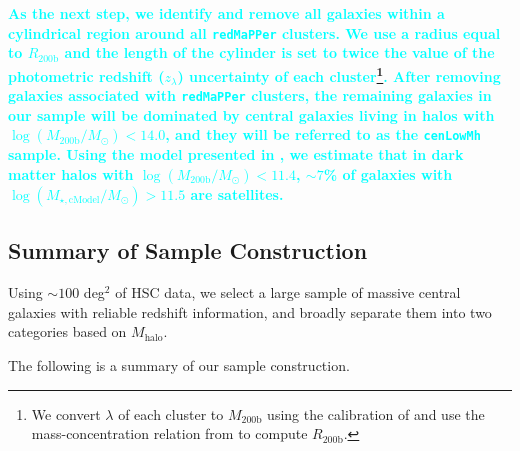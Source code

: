 \documentclass[a4paper,fleqn,usenatbib]{mnras}
\def\redm{\texttt{redMaPPer}}
\def\nbcg{\texttt{cenLowMh}}
\def\logmh{{$\log (M_{\mathrm{200b}}/M_{\odot})$}}
\def\logmcmodel{{$\log (M_{\star,\mathrm{cModel}}/M_{\odot})$}}
\newcommand{\song}[1]{\textcolor{cyan}{\textbf{#1}}}
\begin{document}
    \song{
    As the next step, we identify and remove all galaxies within a cylindrical 
    region around all \redm{} clusters. 
    We use a radius equal to $R_{\mathrm{200b}}$ and the length of the cylinder is 
    set to twice the value of the photometric redshift ($z_{\lambda}$) uncertainty 
    of each cluster\footnote{We convert $\lambda$ of each cluster to 
    $M_{\mathrm{200b}}$ using the calibration of \citet{Simet2016} and use the 
    mass-concentration relation from \citet{Diemer2015} to compute 
    $R_{\mathrm{200b}}$.}.
    After removing galaxies associated with \redm{} clusters, the remaining galaxies 
    in our sample will be dominated by central galaxies living in halos with 
    \logmh{}$< 14.0$, and they will be referred to as the \nbcg{} sample.
    Using the model presented in \citet{Saito2016}, we estimate that in dark matter 
    halos with \logmh$<11.4$, $\sim 7$\% of galaxies with \logmcmodel{}$>11.5$ are 
    satellites.
    }

\subsection{Summary of Sample Construction}
    \label{ssec:sample}

    Using ${\sim} 100$ deg$^2$ of HSC data, we select a large sample of massive central 
    galaxies with reliable redshift information, and broadly separate them into two 
    categories based on $M_{\mathrm{halo}}$.
    
    The following is a summary of our sample construction. 
        
\end{document}
